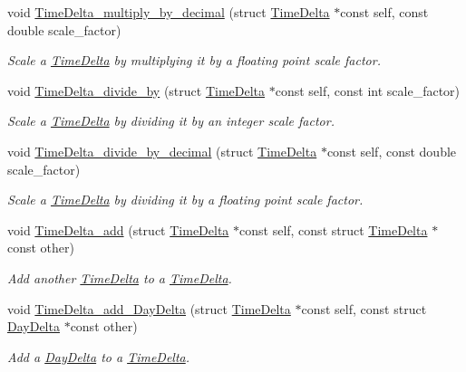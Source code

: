 \begin{DoxyCompactItemize}
void \hyperlink{time-delta_8h_a561fba60f8ba4648928fec8e18069ebb}{Time\-Delta\-\_\-multiply\-\_\-by\-\_\-decimal} (struct \hyperlink{structTimeDelta}{Time\-Delta} $\ast$const self, const double scale\-\_\-factor)
\begin{DoxyCompactList}\small\item\em Scale a \hyperlink{structTimeDelta}{Time\-Delta} by multiplying it by a floating point scale factor. \end{DoxyCompactList}\item 
void \hyperlink{time-delta_8h_abab39f5630f78511f708765da0be8632}{Time\-Delta\-\_\-divide\-\_\-by} (struct \hyperlink{structTimeDelta}{Time\-Delta} $\ast$const self, const int scale\-\_\-factor)
\begin{DoxyCompactList}\small\item\em Scale a \hyperlink{structTimeDelta}{Time\-Delta} by dividing it by an integer scale factor. \end{DoxyCompactList}\item 
void \hyperlink{time-delta_8h_acca21ee20d4addbd3925461259f4f12a}{Time\-Delta\-\_\-divide\-\_\-by\-\_\-decimal} (struct \hyperlink{structTimeDelta}{Time\-Delta} $\ast$const self, const double scale\-\_\-factor)
\begin{DoxyCompactList}\small\item\em Scale a \hyperlink{structTimeDelta}{Time\-Delta} by dividing it by a floating point scale factor. \end{DoxyCompactList}\item 
void \hyperlink{time-delta_8h_a388c9982a85d4f02741d4905fc8c3a1b}{Time\-Delta\-\_\-add} (struct \hyperlink{structTimeDelta}{Time\-Delta} $\ast$const self, const struct \hyperlink{structTimeDelta}{Time\-Delta} $\ast$const other)
\begin{DoxyCompactList}\small\item\em Add another \hyperlink{structTimeDelta}{Time\-Delta} to a \hyperlink{structTimeDelta}{Time\-Delta}. \end{DoxyCompactList}\item 
void \hyperlink{time-delta_8h_a80aa67e85468bf70b53e1eecd3f3e4cd}{Time\-Delta\-\_\-add\-\_\-\-Day\-Delta} (struct \hyperlink{structTimeDelta}{Time\-Delta} $\ast$const self, const struct \hyperlink{structDayDelta}{Day\-Delta} $\ast$const other)
\begin{DoxyCompactList}\small\item\em Add a \hyperlink{structDayDelta}{Day\-Delta} to a \hyperlink{structTimeDelta}{Time\-Delta}. \end{DoxyCompactList}\item 

\end{DoxyCompactItemize}
